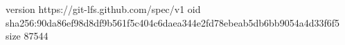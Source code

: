 version https://git-lfs.github.com/spec/v1
oid sha256:90da86ef98d8df9b561f5c404c6daea344e2fd78ebeab5db6bb9054a4d33f6f5
size 87544
